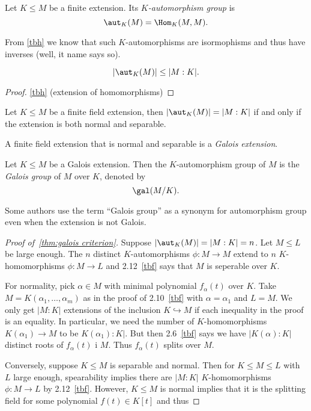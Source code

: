 \documentclass[a4paper]{article}
\begin{document}
\begin{definition}
  Let \(K \leq M\) be a finite extension. Its \emph{\(K\)-automorphism group} is
  \[
    \aut_K(M) = \Hom_K(M, M).
  \]
\end{definition}

From \ref{tbh} we know that such \(K\)-automorphisms are isormophisms and thus have inverses (well, it name says so).

\begin{lemma}
  \[
    |\aut_K(M)| \leq |M:K|.
  \]
\end{lemma}

\begin{proof}
  \ref{tbh} (extension of homomorphisms)
\end{proof}

\begin{theorem}
  \label{thm:galois criterion}
  Let \(K \leq M\) be a finite field extension, then \(|\aut_K(M)| = |M:K|\) if and only if the extension is both normal and separable.
\end{theorem}

\begin{definition}
  A finite field extension that is normal and separable is a \emph{Galois extension}.
\end{definition}

\begin{definition}
  Let \(K \leq M\) be a Galois extension. Then the \(K\)-automorphism group of \(M\) is the \emph{Galois group} of \(M\) over \(K\), denoted by
  \[
    \gal(M/K).
  \]
\end{definition}

\begin{remark}
  Some authors use the term ``Galois group'' as a synonym for automorphism group even when the extension is not Galois.
\end{remark}

\begin{proof}[Proof of~\autoref{thm:galois criterion}]
  Suppose \(|\aut_K(M)| = |M:K| = n\). Let \(M \leq L\)be large enough. The \(n\) distinct \(K\)-automorphisms \(\phi: M \to M\) extend to \(n\) \(K\)-homomorphisms \(\phi: M \to L\) and 2.12~\ref{tbf} says that \(M\) is seperable over \(K\).

  For normality, pick \(\alpha \in M\) with minimal polynomial \(f_\alpha(t)\) over \(K\). Take \(M = K(\alpha_1, \dots, \alpha_m)\) as in the proof of 2.10~\ref{tbf} with \(\alpha = \alpha_1\) and \(L = M\). We only get \(|M:K|\) extensions of the inclusion \(K \hookrightarrow M\) if each inequality in the proof is an equality. In particular, we need the number of \(K\)-homomorphisms \(K(\alpha_1) \to M\) to be \(K(\alpha_1):K|\). But then 2.6~\ref{tbf} says we have \(|K(\alpha):K|\) distinct roots of \(f_\alpha(t)\) i \(M\). Thus \(f_\alpha(t)\) splits over \(M\).

  Conversely, suppose \(K \leq M\) is separable and normal. Then for \(K \leq M \leq L\) with \(L\) large enough, spearability implies there are \(|M:K|\) \(K\)-homomorphisms \(\phi: M \to L\) by 2.12~\ref{tbf}. However, \(K \leq M\) is normal implies that it is the splitting field for some polynomial \(f(t) \in K[t]\) and thus 
\end{proof}
\end{document}
